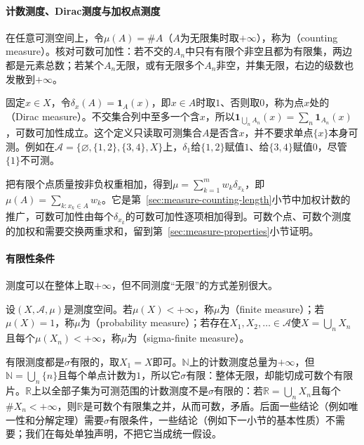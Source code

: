 \paragraph{计数测度、Dirac测度与加权点测度}
在任意可测空间上，令$\mu(A)=\#A$（$A$为无限集时取$+\infty$），称为（counting measure）。核对可数可加性：若不交的$A_n$中只有有限个非空且都为有限集，两边都是元素总数；若某个$A_n$无限，或有无限多个$A_n$非空，并集无限，右边的级数也发散到$+\infty$。

固定$x\in X$，令$\delta_x(A)=\mathbf 1_A(x)$，即$x\in A$时取$1$、否则取$0$，称为点$x$处的（Dirac measure）。不交集合列中至多一个含$x$，所以$\mathbf 1_{\bigcup_nA_n}(x)=\sum_n\mathbf 1_{A_n}(x)$，可数可加性成立。这个定义只读取可测集合$A$是否含$x$，并不要求单点$\{x\}$本身可测。例如在$\mathcal A=\{\varnothing,\{1,2\},\{3,4\},X\}$上，$\delta_1$给$\{1,2\}$赋值$1$、给$\{3,4\}$赋值$0$，尽管$\{1\}$不可测。

把有限个点质量按非负权重相加，得到$\mu=\sum_{k=1}^mw_k\delta_{x_k}$，即$\mu(A)=\sum_{k:x_k\in A}w_k$。它是第~\ref{sec:measure-counting-length}小节中加权计数的推广，可数可加性由每个$\delta_{x_k}$的可数可加性逐项相加得到。可数个点、可数个测度的加权和需要交换两重求和，留到第~\ref{sec:measure-properties}小节证明。

\paragraph{有限性条件}
测度可以在整体上取$+\infty$，但不同测度“无限”的方式差别很大。

\begin{definition}
\label{def:measure-finiteness}
设$(X,\mathcal A,\mu)$是测度空间。若$\mu(X)<+\infty$，称$\mu$为（finite measure）；若$\mu(X)=1$，称$\mu$为（probability measure）；若存在$X_1,X_2,\dots\in\mathcal A$使$X=\bigcup_nX_n$且每个$\mu(X_n)<+\infty$，称$\mu$为（sigma-finite measure）。
\end{definition}

有限测度都是$\sigma$有限的，取$X_1=X$即可。$\mathbb N$上的计数测度总量为$+\infty$，但$\mathbb N=\bigcup_n\{n\}$且每个单点计数为$1$，所以它$\sigma$有限：整体无限，却能切成可数个有限片。$\mathbb R$上以全部子集为可测范围的计数测度不是$\sigma$有限的：若$\mathbb R=\bigcup_nX_n$且每个$\#X_n<+\infty$，则$\mathbb R$是可数个有限集之并，从而可数，矛盾。后面一些结论（例如唯一性和分解定理）需要$\sigma$有限条件，一些结论（例如下一小节的基本性质）不需要；我们在每处单独声明，不把它当成统一假设。

